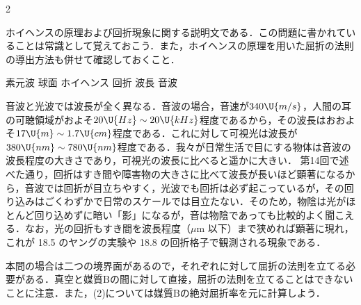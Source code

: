 \begin{multicols}{2}
\par\nopagebreak
\begin{sisin}
ホイヘンスの原理および回折現象に関する説明文である．この問題に書かれていることは常識として覚えておこう．また，ホイヘンスの原理を用いた屈折の法則の導出方法も併せて確認しておくこと．
\end{sisin}
\KaiHead
\begin{komon}
 素元波
 球面
 ホイヘンス
 回折
 波長
 音波
\end{komon}
\begin{chuu}
音波と光波では波長が全く異なる．音波の場合，音速が$340\U{m/s}$，人間の耳の可聴領域がおよそ$20\U{Hz}\sim 20\U{kHz}$程度であるから，その波長はおおよそ$17\U{m}\sim 1.7\U{cm}$程度である．これに対して可視光は波長が$380\U{nm}\sim 780\U{nm}$程度である．我々が日常生活で目にする物体は音波の波長程度の大きさであり，可視光の波長に比べると遥かに大きい．
第14回で述べた通り，回折はすき間や障害物の大きさに比べて波長が長いほど顕著になるから，音波では回折が目立ちやすく，{\gtfamily 光波でも回折は必ず起こっているが，その回り込みはごくわずかで日常のスケールでは目立たない}．そのため，物陰は光がほとんど回り込めずに暗い「影」になるが，音は物陰であっても比較的よく聞こえる．なお，光の回折もすき間を波長程度（$\mu$m 以下）まで狭めれば顕著に現れ，これが 18.5 のヤングの実験や 18.8 の回折格子で観測される現象である．
\end{chuu}

\par\nopagebreak
\begin{sisin}
本問の場合は二つの境界面があるので，それぞれに対して屈折の法則を立てる必要がある．真空と媒質$\mathrm{B}$の間に対して直接，屈折の法則を立てることはできないことに注意．また，(2)については媒質$\mathrm{B}$の絶対屈折率を元に計算しよう．


\end{sisin}
\end{multicols}
